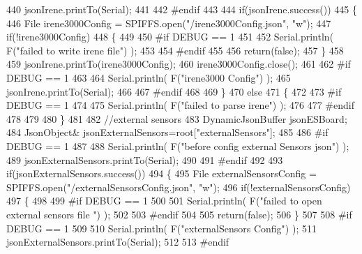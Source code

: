 \begin{DoxyCode}
440     jsonIrene.printTo(Serial);
441 
442 \textcolor{preprocessor}{#endif }
443 
444     \textcolor{keywordflow}{if}(jsonIrene.success())
445     \{
446         File irene3000Config = SPIFFS.open(\textcolor{stringliteral}{"/irene3000Config.json"}, \textcolor{stringliteral}{"w"});   
447         \textcolor{keywordflow}{if}(!irene3000Config)
448         \{
449 
450 \textcolor{preprocessor}{        #if DEBUG == 1 }
451 
452             Serial.println( F(\textcolor{stringliteral}{"failed to write irene file"}) );
453         
454 \textcolor{preprocessor}{        #endif}
455 
456             \textcolor{keywordflow}{return}(\textcolor{keyword}{false});
457         \}
458 
459         jsonIrene.printTo(irene3000Config);
460         irene3000Config.close();
461     
462 \textcolor{preprocessor}{    #if DEBUG == 1 }
463         
464         Serial.println( F(\textcolor{stringliteral}{"irene3000 Config"}) );
465         jsonIrene.printTo(Serial);
466     
467 \textcolor{preprocessor}{    #endif}
468     
469     \}
470     \textcolor{keywordflow}{else}
471     \{
472     
473 \textcolor{preprocessor}{    #if DEBUG == 1 }
474 
475         Serial.println( F(\textcolor{stringliteral}{"failed to parse irene"}) );   
476     
477 \textcolor{preprocessor}{    #endif }
478 
479 
480     \}
481     
482     \textcolor{comment}{//external sensors}
483     DynamicJsonBuffer jsonESBoard;
484         JsonObject& jsonExternalSensors=root[\textcolor{stringliteral}{"externalSensors"}];
485 
486 \textcolor{preprocessor}{#if DEBUG == 1 }
487 
488     Serial.println( F(\textcolor{stringliteral}{"before config external Sensors json"}) );
489     jsonExternalSensors.printTo(Serial);
490 
491 \textcolor{preprocessor}{#endif}
492 
493     \textcolor{keywordflow}{if}(jsonExternalSensors.success())
494     \{
495         File externalSensorsConfig = SPIFFS.open(\textcolor{stringliteral}{"/externalSensorsConfig.json"}, \textcolor{stringliteral}{"w"});   
496         \textcolor{keywordflow}{if}(!externalSensorsConfig)
497         \{
498         
499 \textcolor{preprocessor}{        #if DEBUG == 1 }
500 
501             Serial.println( F(\textcolor{stringliteral}{"failed to open external sensors file "}) );
502         
503 \textcolor{preprocessor}{        #endif }
504 
505             \textcolor{keywordflow}{return}(\textcolor{keyword}{false});
506         \}
507 
508 \textcolor{preprocessor}{#if DEBUG == 1 }
509         
510         Serial.println( F(\textcolor{stringliteral}{"externalSensors Config"}) );
511         jsonExternalSensors.printTo(Serial);
512 
513 \textcolor{preprocessor}{#endif }

\end{DoxyCode}
